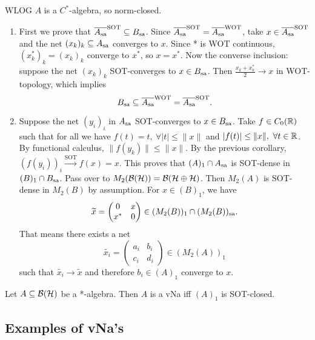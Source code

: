 \begin{myproof}
  WLOG $A$ is a $C^*$-algebra, so norm-closed.
  \begin{enumerate}
    \item First we prove that $\overline{A_{\operatorname{sa}}}^{\mathrm{SOT}} \subseteq B_{\operatorname{sa}}$.
    Since $\overline{A_{\operatorname{sa}}}^{\mathrm{SOT}} = \overline{A_{\operatorname{sa}}}^{\mathrm{WOT}}$, take $x \in \overline{A_{\operatorname{sa}}}^{\mathrm{SOT}}$
    and the net $(x_k)_k \subseteq A_{\operatorname{sa}}$ converges to $x$. Since * is WOT continuous, 
    $(x_k ^*)_k = (x_k)_k$ converge to $x^*$, so $x = x^*$.
    Now the converse inclusion: suppose the net $(x_k)_k$ SOT-converges to $x \in B_{\operatorname{sa}}$.
    Then $\frac{x_k + x_k^*}{2} \to x$ in WOT-topology, which implies 
    $$B_{\operatorname{sa}} \subseteq \overline{A_{\operatorname{sa}}}^{\mathrm{WOT}} = \overline{A_{\operatorname{sa}}}^{\mathrm{SOT}}.$$
    \item Suppose the net $(y_i)_i$ in $A_{\operatorname{sa}}$ SOT-converges to $x \in B_{\operatorname{sa}}$.
    Take $f \in C_0 (\mathbb {R})$ such that for all we have $f(t) = t,\ \forall |t| \leq \|x\|$ and $|f(t)| \leq \|x\|,\ \forall t \in \mathbb {R}$. 
    By functional calculus, $\| f(y_k)\| \leq \|x\|$. By the previous corollary, $(f(y_i))_i \xrightarrow{\mathrm{SOT}} f(x) = x$.
    This proves that $(A)_1 \cap A_{\operatorname{sa}}$ is SOT-dense in $(B)_1 \cap B_{\operatorname{sa}}$.
    Pass over to $M_2 (\operatorname{\mathcal{B} (\mathcal{H})}) = \mathcal{B} (\mathcal{H} \oplus \mathcal{H})$.
    Then $M_2 (A)$ is SOT-dense in $M_2 (B)$ by assumption. For $x \in (B)_1$, we have 
    $$\widetilde{x} = \begin{pmatrix}
      0 & x\\
      x^* & 0
    \end{pmatrix} \in (M_2 (B))_1 \cap (M_2 (B))_{\operatorname{sa}}.$$ 
    That means there exists a net $$\widetilde{x_i} = \begin{pmatrix}
      a_i & b_i\\
      c_i & d_i
    \end{pmatrix} \in (M_2 (A))_1$$ such that $\widetilde{x_i} \to \widetilde{x}$
    and therefore $b_i \in (A)_1$ converge to $x$. \qedhere
  \end{enumerate}
\end{myproof}

\begin{corollary}
  Let $A \subseteq \operatorname{\mathcal{B} (\mathcal{H})}$ be a *-algebra. Then $A$ is a vNa iff $(A)_1$ is SOT-closed.
\end{corollary}

\subsection{Examples of vNa's}

